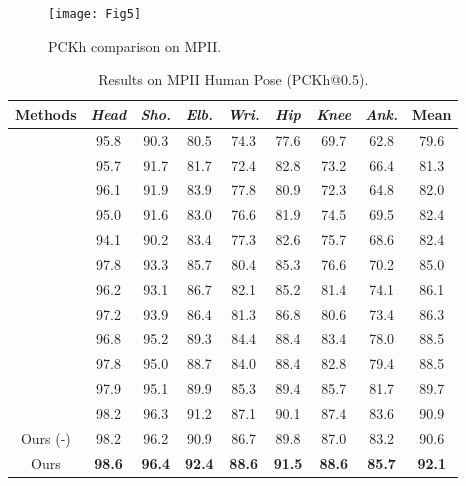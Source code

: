 \documentclass[10pt,letterpaper,twocolumn]{article}
\begin{document}
\begin{figure*}[b!]
\centering
\texttt{[image: Fig5]}
\caption{PCKh comparison on MPII.}
\label{fig:PCKh-comparison-on}
\end{figure*}

\begin{table}[t!]
 \caption{Results on MPII Human Pose (PCKh@0.5).}
 \label{tab:Results-on-MPII}
 \small
 \centering
 \setlength{\tabcolsep}{3.0pt}
 \begin{tabular}{|c||c|c|c|c|c|c|c||c|}
  \hline
   {Methods} & \emph{Head} & \emph{Sho.} & \emph{Elb.} & \emph{Wri.} & \emph{Hip} & \emph{Knee} & \emph{Ank.} & \textbf{Mean} \\
  \hline
  \hline
  \cite{conf/nips/TompsonJLB14} & 95.8 &  90.3  & 80.5  & 74.3  & 77.6  & 69.7  & 62.8 & 79.6\\
  \cite{conf/cvpr/CarreiraAFM16}  & 95.7 &  91.7 &  81.7 &  72.4 &  82.8  & 73.2  & 66.4 & 81.3\\
  \cite{conf/cvpr/TompsonGJLB15}  & 96.1  & 91.9  & 83.9  & 77.8  & 80.9  & 72.3  & 64.8 & 82.0\\
  \cite{conf/cvpr/HuR16}  & 95.0  & 91.6  & 83.0  & 76.6  & 81.9  & 74.5  & 69.5 & 82.4\\
  \cite{conf/iccv/PishchulinAGS13}  & 94.1  & 90.2  & 83.4  & 77.3  & 82.6  & 75.7  & 68.6 & 82.4\\
  \cite{conf/eccv/LifshitzFU16}  & 97.8  & 93.3  & 85.7  & 80.4  & 85.3  & 76.6  & 70.2 & 85.0\\
  \cite{conf/eccv/GkioxariTJ16}  & 96.2  & 93.1  & 86.7  & 82.1  & 85.2  & 81.4 &  74.1 & 86.1\\
  \cite{BMVC2016}  & 97.2  & 93.9  & 86.4  & 81.3  & 86.8  & 80.6  & 73.4 & 86.3\\
  \cite{conf/eccv/InsafutdinovPAA16}  & 96.8 &  95.2 &  89.3  & 84.4  & 88.4  & 83.4 &  78.0 & 88.5\\
  \cite{conf/cvpr/WeiRKS16}  & 97.8  & 95.0  & 88.7  & 84.0  & 88.4 &  82.8  & 79.4 & 88.5\\
  \cite{conf/eccv/BulatT16}  & 97.9  & 95.1  & 89.9 &  85.3  & 89.4 &  85.7  & 81.7 & 89.7\\
  \cite{conf/eccv/NewellYD16}  & 98.2  & 96.3  & 91.2  & 87.1  & 90.1  & 87.4  & 83.6 & 90.9\\
  \hline
  \hline
    Ours (-)\footnotemark[1]& {98.2}& {96.2}& {90.9}& {86.7}& {89.8}& {87.0}& {83.2}&{90.6}\\
  \hline
  Ours & \textbf{98.6}& \textbf{96.4}& \textbf{92.4}& \textbf{88.6}& \textbf{91.5}& \textbf{88.6}& \textbf{85.7}&\textbf{92.1}\\
  \hline
 \end{tabular}
\end{table}
\end{document}
